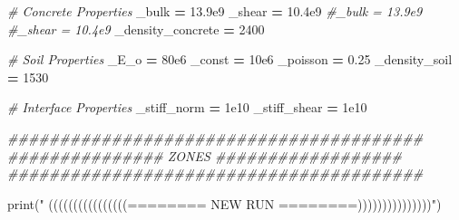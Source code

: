 \documentclass[a4paper, nobind]{templates/ociamthesis}
\newenvironment{Shaded}{\begin{snugshade}}{\end{snugshade}}
\newcommand{\BuiltInTok}[1]{#1}
\newcommand{\CommentTok}[1]{\textcolor[rgb]{0.56,0.35,0.01}{\textit{#1}}}
\newcommand{\DecValTok}[1]{\textcolor[rgb]{0.00,0.00,0.81}{#1}}
\newcommand{\FloatTok}[1]{\textcolor[rgb]{0.00,0.00,0.81}{#1}}
\newcommand{\NormalTok}[1]{#1}
\newcommand{\OperatorTok}[1]{\textcolor[rgb]{0.81,0.36,0.00}{\textbf{#1}}}
\newcommand{\StringTok}[1]{\textcolor[rgb]{0.31,0.60,0.02}{#1}}
\renewenvironment{Shaded}
{
  \vspace{10pt}%
  \begin{snugshade}%
}{%
  \end{snugshade}%
  \vspace{8pt}%
}
\begin{document}
\begin{Shaded}
\begin{Highlighting}[]
\CommentTok{\# Concrete Properties}
\NormalTok{\_bulk }\OperatorTok{=} \FloatTok{13.9e9}
\NormalTok{\_shear }\OperatorTok{=} \FloatTok{10.4e9}
\CommentTok{\#\_bulk = 13.9e9}
\CommentTok{\#\_shear = 10.4e9}
\NormalTok{\_density\_concrete }\OperatorTok{=} \DecValTok{2400}

\CommentTok{\# Soil Properties}
\NormalTok{\_E\_o }\OperatorTok{=} \FloatTok{80e6}
\NormalTok{\_const }\OperatorTok{=} \FloatTok{10e6}
\NormalTok{\_poisson }\OperatorTok{=} \FloatTok{0.25}
\NormalTok{\_density\_soil }\OperatorTok{=} \DecValTok{1530}

\CommentTok{\# Interface Properties}
\NormalTok{\_stiff\_norm }\OperatorTok{=} \FloatTok{1e10}
\NormalTok{\_stiff\_shear }\OperatorTok{=} \FloatTok{1e10}

\CommentTok{\#\#\#\#\#\#\#\#\#\#\#\#\#\#\#\#\#\#\#\#\#\#\#\#\#\#\#\#\#\#\#\#\#\#\#\#\#\#\#\#}
\CommentTok{\#\#\#\#\#\#\#\#\#\#\#\#\#\#\# ZONES \#\#\#\#\#\#\#\#\#\#\#\#\#\#\#\#\#\#}
\CommentTok{\#\#\#\#\#\#\#\#\#\#\#\#\#\#\#\#\#\#\#\#\#\#\#\#\#\#\#\#\#\#\#\#\#\#\#\#\#\#\#\#}

\BuiltInTok{print}\NormalTok{(}\StringTok{"       ((((((((((((((((======== NEW RUN ========)))))))))))))))"}\NormalTok{)}


\end{Highlighting}
\end{Shaded}
\end{document}
